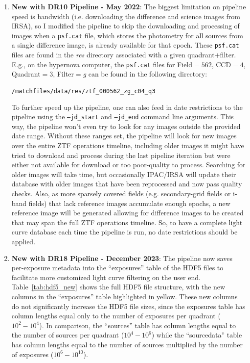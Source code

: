 \documentclass[12pt]{article}
\begin{document}
\begin{enumerate}
    \item {\bf New with DR10 Pipeline - May 2022}: The biggest limitation on pipeline speed is bandwidth (i.e. downloading the difference and science images from IRSA), so I modified the pipeline to skip the downloading and processing of images when a {\tt psf.cat} file, which stores the photometry for all sources from a single difference image, is already available for that epoch. These {\tt psf.cat} files are found in the {\it res} directory associated with a given quadrant$+$filter. E.g., on the hypernova computer, the {\tt psf.cat} files for Field$=562$, CCD$=4$, Quadrant$=3$, Filter$=${\it g} can be found in the following directory:
    \begin{center}
        {\tt /matchfiles/data/res/ztf\_000562\_zg\_c04\_q3}
    \end{center}
    To further speed up the pipeline, one can also feed in date restrictions to the pipeline using the {\tt --jd\_start} and {\tt --jd\_end} command line arguments. This way, the pipeline won't even try to look for any images outside the provided date range. Without these ranges set, the pipeline will look for new images over the entire ZTF operations timeline, including older images it might have tried to download and process during the last pipeline iteration but were either not available for download or too poor-quality to process. Searching for older images will take time, but occasionally IPAC/IRSA will update their database with older images that have been reprocessed and now pass quality checks. Also, as more sparsely covered fields (e.g. secondary-grid fields or i-band fields) that lack reference images accumulate enough epochs, a new reference image will be generated allowing for difference images to be created that may span the full ZTF operations timeline. So, to have a complete light curve database each time the pipeline is run, no date restrictions should be applied.

    \item {\bf New with DR18 Pipeline - December 2023}: The pipeline now saves per-exposure metadata into the ``exposures'' table of the HDF5 files to facilitate more customized light curve filtering on the user end. Table~\ref{tab:hdf5_new} shows the full HDF5 file structure, with the new columns in the ``exposures'' table highlighted in yellow. These new columns do not significantly increase the HDF5 file sizes, since the exposures table has column lengths equal only to the number of exposures per quadrant ($10^2-10^4$). In comparison, the ``sources'' table has column lengths equal to the number of sources per quadrant ($10^4-10^6$) while the ``sourcedata'' table has column lengths equal to the number of sources multiplied by the number of exposures ($10^6-10^{10}$).


\end{enumerate}
\end{document}
